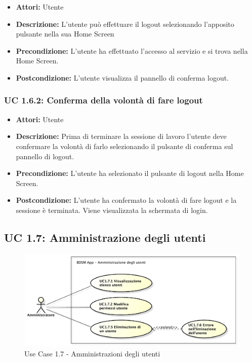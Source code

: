 \begin{itemize}
    \item \textbf{Attori:} Utente
    \item \textbf{Descrizione:} L'utente può effettuare il logout selezionando l'apposito pulsante nella sua Home Screen
    \item \textbf{Precondizione:} L'utente ha effettuato l'accesso al servizio e si trova nella Home Screen.
    \item \textbf{Postcondizione:} L'utente visualizza il pannello di conferma logout.
\end{itemize}

\subsubsection{UC 1.6.2: Conferma della volontà di fare logout}

\begin{itemize}
    \item \textbf{Attori:} Utente
    \item \textbf{Descrizione:} Prima di terminare la sessione di lavoro l'utente deve confermare la volontà di farlo selezionando il pulsante di conferma sul pannello di logout.
    \item \textbf{Precondizione:} L'utente ha selezionato il pulsante di logout nella Home Screen.
    \item \textbf{Postcondizione:} L'utente ha confermato la volontà di fare logout e la sessione è terminata. Viene visualizzata la schermata di login.
\end{itemize}



\subsection{UC 1.7: Amministrazione degli utenti}

\begin{figure}[!htbp]
    \centering
    \centerline{\includegraphics[scale=0.45]{./images/UC1_7.pdf}}
    \caption{Use Case 1.7 - Amministrazioni degli utenti}
\end{figure}

